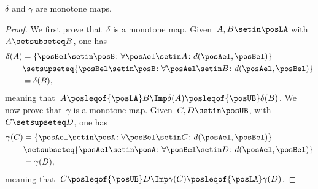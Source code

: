 \begin{lemma}
    \label{lem:deltagammamonotone}
    $\delta$ and $\gamma$ are monotone maps.
\end{lemma}
\begin{proof}
    We first prove that~$\delta$ is a monotone map.
    Given~$A,B\setin \posLA$ with~$A\setsubseteq B$, one has
    \begin{equation}
        \begin{aligned}
            \delta(A) & =\{\posBel\setin \posB\colon \forall \posAel \setin A\colon d(\posAel,\posBel)\} \\
                      & \setsupseteq \{\posBel\setin \posB\colon \forall \posAel\setin B \colon d(\posAel,\posBel)\} \\
                      & =\delta(B),
        \end{aligned}
    \end{equation}
    meaning that~$A\posleqof{\posLA} B \Imp \delta(A)\posleqof{\posUB} \delta(B)$.
    We now prove that~$\gamma$ is a monotone map.
    Given~$C,D\setin \posUB$, with~$C\setsupseteq D$, one has
    \begin{equation}
        \begin{aligned}
            \gamma(C) & =\{\posAel\setin \posA\colon \forall \posBel \setin C\colon d(\posAel,\posBel)\} \\
                      & \setsubseteq \{\posAel\setin \posA\colon \forall \posBel \setin D \colon d(\posAel,\posBel)\} \\
                      & =\gamma(D),
        \end{aligned}
    \end{equation}
    meaning that~$C\posleqof{\posUB} D \Imp \gamma(C)\posleqof{\posLA} \gamma(D)$.
\end{proof}

